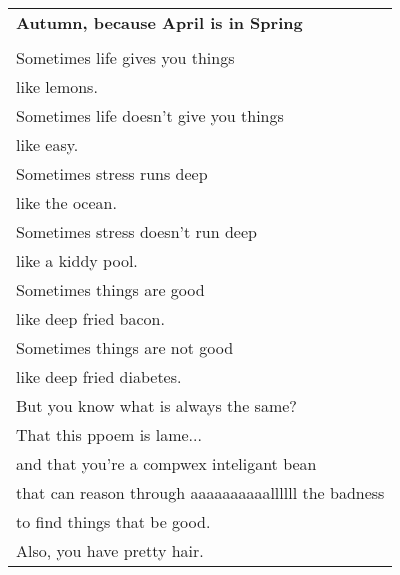 \documentclass{article}
\begin{document}
\newcommand{\h}{\hspace{3ex}}
\newcommand{\hoar}{%
\begin{center}
\line(1,0){350}
\end{center}
}

\begin{center}
\begin{tabular}{l}
\textbf{Autumn, because April is in Spring} \\
\\
Sometimes life gives you things \\
\h{}like lemons. \\
Sometimes life doesn't give you things \\
\h{}like easy. \\
Sometimes stress runs deep \\
\h{}like the ocean. \\
Sometimes stress doesn't run deep \\
\h{}like a kiddy pool. \\
Sometimes things are good \\
\h{}like deep fried bacon. \\
Sometimes things are not good \\
\h{}like deep fried diabetes. \\
But you know what is always the same? \\
\h{}That this ppoem is lame... \\
\h{}and that you're a compwex inteligant bean \\
\h{}that can reason through aaaaaaaaaallllll the badness \\
\h{}to find things that be good. \\
Also, you have pretty hair. \\
\end{tabular}
\end{center}
\end{document}
